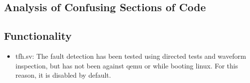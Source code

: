 \subsection{Analysis of Confusing Sections of Code}

\subsection{Functionality}
\label{sec:mmufunct}

\begin{itemize}
\item tfh.sv: 
The fault detection has been tested using directed tests and waveform inspection, but has not been against qemu or while booting linux.
For this reason, it is disabled by default.
\end{itemize}

